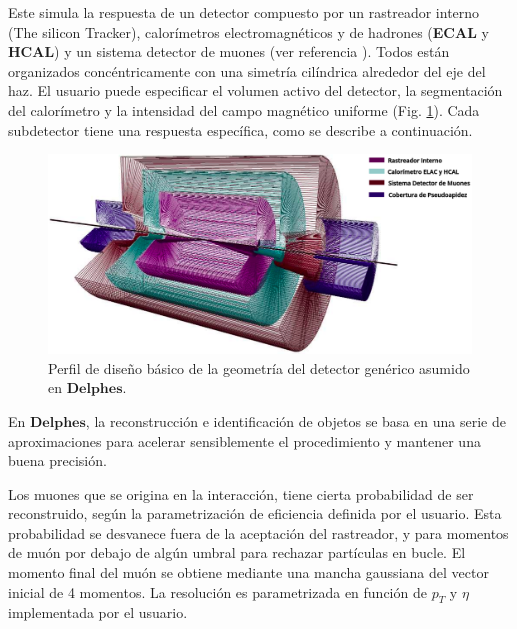Este simula la respuesta de un detector compuesto por un rastreador interno (The silicon Tracker), calorímetros electromagnéticos y de hadrones (\textbf{ECAL} y \textbf{HCAL}) y un sistema detector de muones (ver referencia \cite{de_favereau_Delphes_2014}). Todos están organizados concéntricamente con una simetría cilíndrica alrededor del eje del haz. El usuario puede especificar el volumen activo del detector, la segmentación del calorímetro y la intensidad del campo magnético uniforme (Fig. \ref{Delphes}). Cada subdetector tiene una respuesta específica, como se describe a continuación.

\begin{figure}[!t]
    \centering
    \includegraphics[width=.95\textwidth]{Cap2/imagenes/delphes.png}
    \caption[Perfil de diseño básico de la geometría del detector genérico asumido en  \textbf{Delphes}.]{Perfil de diseño básico de la geometría del detector genérico asumido en  $\mathbf{Delphes}$.\footnotemark}
    \label{Delphes}
\end{figure}


En $\mathbf{Delphes}$, la reconstrucción e identificación de objetos se basa en una serie de aproximaciones para acelerar sensiblemente el procedimiento y mantener una buena precisión. 

Los muones que se origina en la interacción, tiene cierta probabilidad de ser reconstruido, según la parametrización de eficiencia definida por el usuario. Esta probabilidad se desvanece fuera de la aceptación del rastreador, y para momentos de muón por debajo de algún umbral para rechazar partículas en bucle. El momento final del muón se obtiene mediante una mancha gaussiana del vector inicial de 4 momentos. La resolución es parametrizada en función de $p_T$ y $\eta$ implementada por el usuario.

